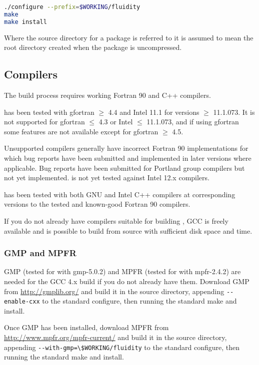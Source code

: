 \begin{lstlisting}[language=bash]
./configure --prefix=$WORKING/fluidity
make
make install
\end{lstlisting}

Where the source directory for a package is referred to it is assumed to mean
the root directory created when the package is uncompressed.

\subsection{Compilers}
\label{sec:required_libraries_compilers}

The \fluidity build process requires working Fortran 90 and C++ compilers.

\fluidity has been tested with gfortran $\geq$ 4.4 and Intel 11.1 for versions
$\geq$ 11.1.073. It is not supported for gfortran $\leq$ 4.3 or Intel $\leq$
11.1.073, and if using gfortran some features are not available except for
gfortran $\geq$ 4.5.

Unsupported compilers generally have incorrect Fortran 90 implementations for
which bug reports have been submitted and implemented in later versions where
applicable. Bug reports have been submitted for Portland group compilers but
not yet implemented. \fluidity is not yet tested against Intel 12.x compilers.

\fluidity has been tested with both GNU and Intel C++ compilers at corresponding
versions to the tested and known-good Fortran 90 compilers.

If you do not already have compilers suitable for building \fluidity, GCC is
freely available and is possible to build from source with sufficient disk
space and time.

\subsubsection{GMP and MPFR}
\label{sec:required_libraries_compilers_gmp_mpfr}

GMP (tested for \fluidity with gmp-5.0.2) and MPFR (tested for \fluidity with
mpfr-2.4.2) are needed for the GCC 4.x build if you do not already have them.
Download GMP from \url{http://gmplib.org/} and build it in the source
directory, appending \lstinline[language=bash]+--enable-cxx+ to the standard
configure, then running the standard make and install.

Once GMP has been installed, download MPFR from
\url{http://www.mpfr.org/mpfr-current/} and build it in the source directory,
appending \lstinline[language=bash]+--with-gmp=\$WORKING/fluidity+ to the
standard configure, then running the standard make and install.

